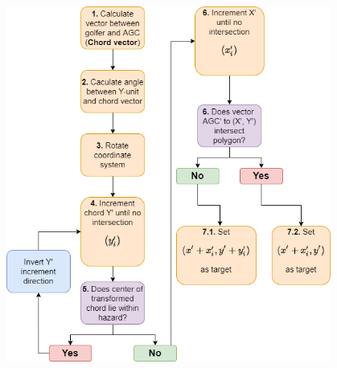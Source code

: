 \documentclass[11pt,landscape]{article}
\begin{document}
\begin{multicols}{3}
\begin{figure}[H]
    \begin{mdframed}
        \begin{center}
            \includegraphics[width=0.95\textwidth]{pathfinding_flow.png}
        \end{center}
    \end{mdframed}
    \label{fig:pathfinding_flow}
\end{figure}


\end{multicols}
\end{document}
